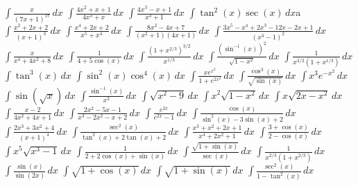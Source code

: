 \documentclass{article}
\begin{document}
\begin{tasks}[label=\arabic*., label-width=18pt]
  \task \( \displaystyle \int \frac{x}{(7x + 1)^{17}} \, dx \)
  \task \( \displaystyle \int \frac{4x^2 + x + 1}{4x^3 + x} \, dx \)
  \task \( \displaystyle \int \frac{4x^3 - x + 1}{x^3 + 1} \, dx \)
  \task \( \displaystyle \int \tan^2(x) \sec(x) \, dx \)a
  \task \( \displaystyle \int \frac{x^2 + 2x + 2}{(x + 1)^3} \, dx \)
  \task \( \displaystyle \int \frac{x^4 + 2x + 2}{x^5 + x^4} \, dx \)
  \task \( \displaystyle \int \frac{8x^2 - 4x + 7}{(x^2 + 1)(4x + 1)} \, dx \)
  \task \( \displaystyle \int \frac{3x^5 - x^4 +2x^3 - 12x -2x + 1}{(x^3 - 1)^2} \, dx \)
  \task \( \displaystyle \int \frac{x}{x^4 + 4x^2 + 8} \, dx \)
  \task \( \displaystyle \int \frac{1}{4 + 5 \cos(x)} \, dx \)
  \task \( \displaystyle \int \frac{(1 + x^{2/3})^{3/2}}{x^{1/3}} \, dx \)
  \task \( \displaystyle \int \frac{(\sin^{-1}(x))^2}{\sqrt{1 - x^2}} \, dx \)
  \task \( \displaystyle \int \frac{1}{x^{3/2}(1 + x^{1/3})} \, dx \)
  \task \( \displaystyle \int \tan^3(x) \, dx \)
  \task \( \displaystyle \int \sin^2(x) \cos^4(x) \, dx \)
  \task \( \displaystyle \int \frac{x e^{x^2}}{1 + e^{2x^2}} \, dx \)
  \task \( \displaystyle \int \frac{\cos^3(x)}{\sqrt{\sin(x)}} \, dx \)
  \task \( \displaystyle \int x^3 e^{-x^2} \, dx \)
  \task \( \displaystyle \int \sin(\sqrt{x}) \, dx \)
  \task \( \displaystyle \int \frac{\sin^{-1}(x)}{x^2} \, dx \)
  \task \( \displaystyle \int \sqrt{x^2 - 9} \, dx \)
  \task \( \displaystyle \int x^2 \sqrt{1 - x^2} \, dx \)
  \task \( \displaystyle \int x \sqrt{2x - x^2} \, dx \)
  \task \( \displaystyle \int \frac{x - 2}{4x^2 + 4x + 1} \, dx \)
  \task \( \displaystyle \int \frac{2x^2 - 5x - 1}{x^3 - 2x^2 - x + 2} \, dx \)
  \task \( \displaystyle \int \frac{e^{2x}}{e^{2x} - 1} \, dx \)
  \task \( \displaystyle \int \frac{\cos(x)}{\sin^2(x) - 3 \sin(x) + 2} \, dx \)
  \task \( \displaystyle \int \frac{2x^3 + 3x^2 + 4}{(x + 1)^4} \, dx \)
  \task \( \displaystyle \int \frac{\sec^2(x)}{\tan^2(x) + 2 \tan(x) + 2} \, dx \)
  \task \( \displaystyle \int \frac{x^3 + x^2 + 2x + 1}{x^4 + 2x^2 + 1} \, dx \)
  \task \( \displaystyle \int \frac{3 + \cos(x)}{2 - \cos(x)} \, dx \)
  \task \( \displaystyle \int x^5 \sqrt{x^3 - 1} \, dx \)
  \task \( \displaystyle \int \frac{1}{2 + 2 \cos(x) + \sin(x)} \, dx \)
  \task \( \displaystyle \int \frac{\sqrt{1 + \sin(x)}}{\sec(x)} \, dx \)
  \task \( \displaystyle \int \frac{1}{x^{2/3} (1 + x^{2/3})} \, dx \)
  \task \( \displaystyle \int \frac{\sin(x)}{\sin(2x)} \, dx \)
  \task \( \displaystyle \int \sqrt{1 + \cos(x)} \, dx \)
  \task \( \displaystyle \int \sqrt{1 + \sin(x)} \, dx \)
  \task \( \displaystyle \int \frac{\sec^2(x)}{1 - \tan^2(x)} \, dx \)

\end{tasks}
\end{document}
